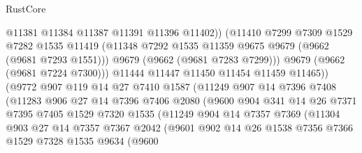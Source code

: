 \begin{lexlean}{RustCore}
\begin{coremodule}
                            @11381
                            @11384
                            @11387
                            @11391
                            @11396
                            @11402))
                        (@11410
                          @7299
                          @7309
                          @1529
                          @7282
                          @1535
                          @11419
                          (@11348 @7292 @1535 @11359 @9675 @9679 (@9662 (@9681 @7293 @1551)))
                          @9679
                          (@9662 (@9681 @7283 @7299)))
                        @9679
                        (@9662 (@9681 @7224 @7300)))
                      @11444
                      @11447
                      @11450
                      @11454
                      @11459
                      @11465))
                  (@9772
                    @907
                    @119
                    @14
                    @27
                    @7410
                    @1587
                    (@11249
                      @907
                      @14
                      @7396
                      @7408
                      (@11283
                        @906
                        @27
                        @14
                        @7396
                        @7406
                        @2080
                        (@9600
                          @904
                          @341
                          @14
                          @26
                          @7371
                          @7395
                          @7405
                          @1529
                          @7320
                          @1535
                          (@11249
                            @904
                            @14
                            @7357
                            @7369
                            (@11304
                              @903
                              @27
                              @14
                              @7357
                              @7367
                              @2042
                              (@9601
                                @902
                                @14
                                @26
                                @1538
                                @7356
                                @7366
                                @1529
                                @7328
                                @1535
                                @9634
                                (@9600

\end{coremodule}
\end{lexlean}
